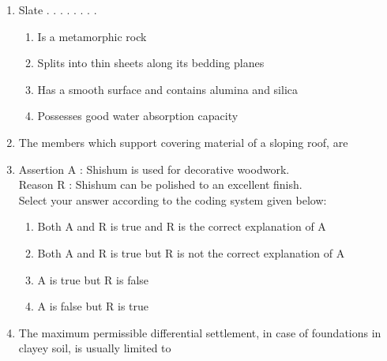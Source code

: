 \documentclass[11pt,a4paper]{article}
\begin{document}
\begin{enumerate}
\\
\item{Slate . . . . . . . .}
\begin{enumerate}[label=\Alph*.]
\item{Is a metamorphic rock}
\item{Splits into thin sheets along its bedding planes}
\item{Has a smooth surface and contains alumina and silica}
\item{Possesses good water absorption capacity}
\end{enumerate}
\item{The members which support covering material of a sloping roof, are}
\\
\item{Assertion A : Shishum is used for decorative woodwork. \\
Reason R : Shishum can be polished to an excellent finish. \\
Select your answer according to the coding system given below:}
\begin{enumerate}[label=\Alph*.]
\item{Both A and R is true and R is the correct explanation of A}
\item{Both A and R is true but R is not the correct explanation of A}
\item{A is true but R is false}
\item{A is false but R is true}
\end{enumerate}
\item{The maximum permissible differential settlement, in case of foundations in clayey soil, is usually limited to}
\\\begin{enumerate*}[itemjoin=\qquad, label=\Alph*.]
\item{10 mm}

\end{enumerate*}
\end{enumerate}
\end{document}
